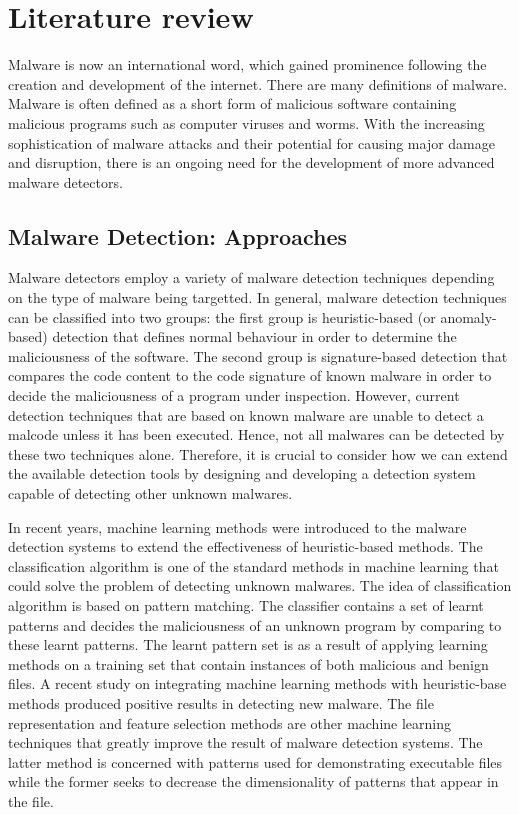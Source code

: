 \section{Literature review}

Malware is now an international word, which gained prominence following the
creation and development of the internet. There are many definitions of
malware. Malware is often defined as a short form of malicious software 
containing malicious programs such as computer viruses and worms. With the
increasing sophistication of malware attacks and their potential for causing
major damage and disruption, there is an ongoing need for the development of
more advanced malware detectors\cite{Malware-tech}.

\subsection{Malware Detection: Approaches}

Malware detectors employ a variety of malware detection techniques depending on
the type of malware being targetted. In general, malware detection techniques
can be classified into two groups: the first group is heuristic-based (or
anomaly-based) detection that defines normal behaviour in order to determine
the maliciousness of the software. The second group is signature-based
detection that compares the code content to the code signature of known malware in
order to decide the maliciousness of a program under inspection. However,
current detection techniques that are based on known malware are unable to
detect a malcode unless it has been executed. Hence, not all malwares can
be detected by these two techniques alone. Therefore, it is crucial to consider how
we can extend the available detection tools by designing and developing a
detection system capable of detecting other unknown
malwares\cite{Malware-tech}.
 

In recent years, machine learning methods were introduced to the malware
detection systems to extend the effectiveness of heuristic-based methods. The
classification algorithm is one of the standard methods in machine learning
that could solve the problem of detecting unknown malwares\cite{Machin-learn}.
The idea of classification algorithm is based on pattern matching. The
classifier contains a set of learnt patterns and decides the maliciousness of
an unknown program by comparing to these learnt patterns. The learnt pattern set is as
a result of applying learning methods on a training set that contain instances
of both malicious and benign files. A recent study on integrating machine
learning methods with heuristic-base methods produced positive results in
detecting new malware\cite{Machin-learn}. The file representation and feature
selection methods are other machine learning techniques that greatly improve
the result of malware detection systems. The latter method is concerned with
patterns used for demonstrating executable files while the former seeks to
decrease the dimensionality of patterns that appear in the
file\cite{Machin-learn}.

